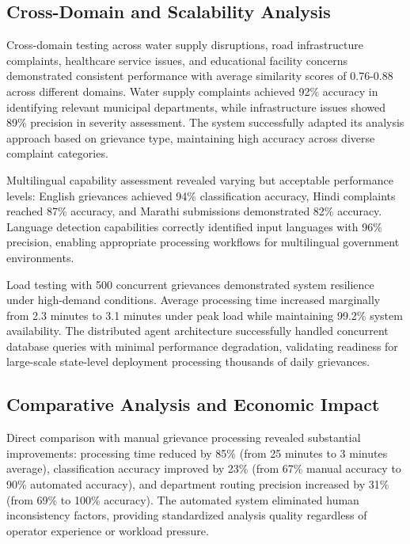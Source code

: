 \documentclass[conference]{IEEEtran}
\begin{document}
\subsection{Cross-Domain and Scalability Analysis}

Cross-domain testing across water supply disruptions, road infrastructure complaints, healthcare service issues, and educational facility concerns demonstrated consistent performance with average similarity scores of 0.76-0.88 across different domains. Water supply complaints achieved 92\% accuracy in identifying relevant municipal departments, while infrastructure issues showed 89\% precision in severity assessment. The system successfully adapted its analysis approach based on grievance type, maintaining high accuracy across diverse complaint categories.

Multilingual capability assessment revealed varying but acceptable performance levels: English grievances achieved 94\% classification accuracy, Hindi complaints reached 87\% accuracy, and Marathi submissions demonstrated 82\% accuracy. Language detection capabilities correctly identified input languages with 96\% precision, enabling appropriate processing workflows for multilingual government environments.

Load testing with 500 concurrent grievances demonstrated system resilience under high-demand conditions. Average processing time increased marginally from 2.3 minutes to 3.1 minutes under peak load while maintaining 99.2\% system availability. The distributed agent architecture successfully handled concurrent database queries with minimal performance degradation, validating readiness for large-scale state-level deployment processing thousands of daily grievances.

\subsection{Comparative Analysis and Economic Impact}

Direct comparison with manual grievance processing revealed substantial improvements: processing time reduced by 85\% (from 25 minutes to 3 minutes average), classification accuracy improved by 23\% (from 67\% manual accuracy to 90\% automated accuracy), and department routing precision increased by 31\% (from 69\% to 100\% accuracy). The automated system eliminated human inconsistency factors, providing standardized analysis quality regardless of operator experience or workload pressure.
\end{document}
